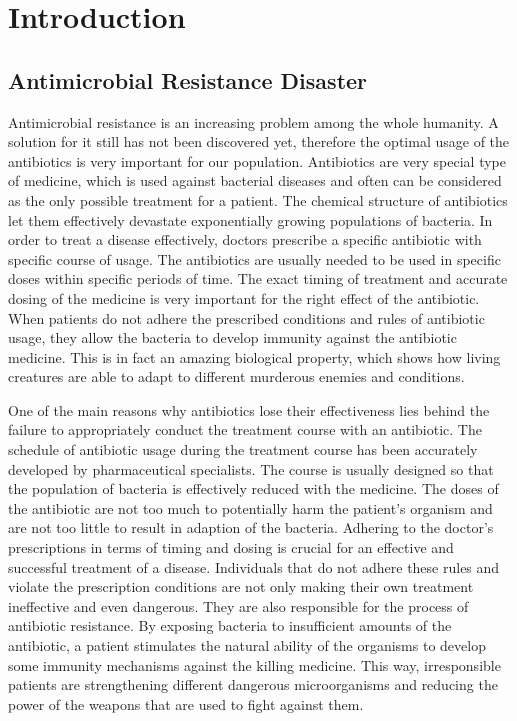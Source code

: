\chapter{Introduction}


\section{Antimicrobial Resistance Disaster}

Antimicrobial resistance is an increasing problem among the whole humanity. A solution for it still has not been discovered yet, therefore the optimal usage of the antibiotics is very important for our population. Antibiotics are very special type of medicine, which is used against bacterial diseases and often can be considered as the only possible treatment for a patient. The chemical structure of antibiotics let them effectively devastate exponentially growing populations of bacteria. In order to treat a disease effectively, doctors prescribe a specific antibiotic with specific course of usage. The antibiotics are usually needed to be used in specific doses within specific periods of time. The exact timing of treatment and accurate dosing of the medicine is very important for the right effect of the antibiotic. When patients do not adhere the prescribed conditions and rules of antibiotic usage, they allow the bacteria to develop immunity against the antibiotic medicine. This is in fact an amazing biological property, which shows how living creatures are able to adapt to different murderous enemies and conditions.

One of the main reasons why antibiotics lose their effectiveness lies behind the failure to appropriately conduct the treatment course with an antibiotic. The schedule of antibiotic usage during the treatment course has been accurately developed by pharmaceutical specialists. The course is usually designed so that the population of bacteria is effectively reduced with the medicine. The doses of the antibiotic are not too much to potentially harm the patient's organism and are not too little to result in adaption of the bacteria. Adhering to the doctor's prescriptions in terms of timing and dosing is crucial for an effective and successful treatment of a disease. Individuals that do not adhere these rules and violate the prescription conditions are not only making their own treatment ineffective and even dangerous. They are also responsible for the process of antibiotic resistance. By exposing bacteria to insufficient amounts of the antibiotic, a patient stimulates the natural ability of the organisms to develop some immunity mechanisms against the killing medicine. This way, irresponsible patients are strengthening different dangerous microorganisms and reducing the power of the weapons that are used to fight against them.

